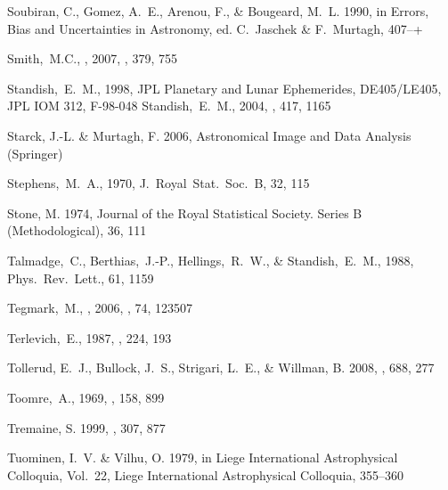 \begin{thebibliography}{99}
{Soubiran}, C., {Gomez}, A.~E., {Arenou}, F., \& {Bougeard}, M.~L. 1990, in
  Errors, Bias and Uncertainties in Astronomy, ed. C.~{Jaschek} \&
  F.~{Murtagh}, 407--+

  Smith,~M.C., \etal, 2007, \mnras, 379, 755

  Standish,~E.~M., 1998,
  JPL Planetary and Lunar Ephemerides, DE405/LE405,
  JPL IOM 312, F-98-048
  Standish,~E.~M., 2004,
  \aap, 417, 1165

{Starck}, J.-L. \& {Murtagh}, F. 2006, {Astronomical Image and Data Analysis}
  ({Springer})

  Stephens,~M.~A., 1970,
  J.~Royal~Stat.~Soc.~B, 32, 115

{Stone}, M. 1974, Journal of the Royal Statistical Society. Series B
  (Methodological), 36, 111

  Talmadge,~C., Berthias,~J.-P., Hellings,~R.~W., \& Standish,~E.~M., 1988,
  Phys.~Rev.~Lett., 61, 1159

  Tegmark,~M., \etal, 2006, \prd, 74, 123507

  Terlevich,~E., 1987,
  \mnras, 224, 193

{Tollerud}, E.~J., {Bullock}, J.~S., {Strigari}, L.~E., \& {Willman}, B. 2008,
  \apj, 688, 277

  Toomre,~A., 1969,
  \apj, 158, 899

{Tremaine}, S. 1999, \mnras, 307, 877

{Tuominen}, I.~V. \& {Vilhu}, O. 1979, in Liege International Astrophysical
  Colloquia, Vol.~22, Liege International Astrophysical Colloquia, 355--360


\end{thebibliography}
